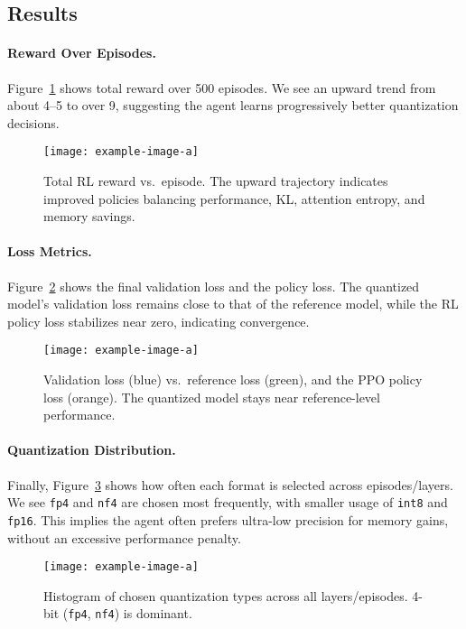 \documentclass{article}
\begin{document}
\subsection{Results}

\paragraph{Reward Over Episodes.}
Figure~\ref{fig:reward} shows total reward over 500 episodes. We see an upward trend from about 4--5 to over 9, suggesting the agent learns progressively better quantization decisions.

\begin{figure}[t]
	\centering
	\texttt{[image: example-image-a]}
	\caption{Total RL reward vs.\ episode. The upward trajectory indicates improved policies balancing performance, KL, attention entropy, and memory savings.}
	\label{fig:reward}
\end{figure}

\paragraph{Loss Metrics.}
Figure~\ref{fig:losses} shows the final validation loss and the policy loss. The quantized model's validation loss remains close to that of the reference model, while the RL policy loss stabilizes near zero, indicating convergence.

\begin{figure}[t]
	\centering
	\texttt{[image: example-image-a]}
	\caption{Validation loss (blue) vs.\ reference loss (green), and the PPO policy loss (orange). The quantized model stays near reference-level performance.}
	\label{fig:losses}
\end{figure}

\paragraph{Quantization Distribution.}
Finally, Figure~\ref{fig:quant-dist} shows how often each format is selected across episodes/layers. We see \texttt{fp4} and \texttt{nf4} are chosen most frequently, with smaller usage of \texttt{int8} and \texttt{fp16}. This implies the agent often prefers ultra-low precision for memory gains, without an excessive performance penalty.

\begin{figure}[t]
	\centering
	\texttt{[image: example-image-a]}
	\caption{Histogram of chosen quantization types across all layers/episodes. 4-bit (\texttt{fp4}, \texttt{nf4}) is dominant.}
	\label{fig:quant-dist}
\end{figure}
\end{document}

